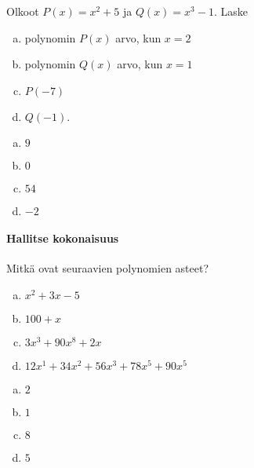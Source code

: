 \begin{tehtavasivu}
\begin{tehtava}
    Olkoot $P(x)=x^2+5$ ja $Q(x)=x^3-1$. Laske
    \begin{enumerate}[a)]
        \item polynomin $P(x)$ arvo, kun $x=2$
        \item polynomin $Q(x)$ arvo, kun $x=1$
        \item $P(-7)$
        \item $Q(-1)$.
    \end{enumerate}
    \begin{vastaus}
        \begin{enumerate}[a)]
            \item $9$ %
            \item $0$ %
            \item $54$ %
            \item $-2$ %
        \end{enumerate}
    \end{vastaus}
\end{tehtava}

\paragraph*{Hallitse kokonaisuus}

\begin{tehtava}
	Mitkä ovat seuraavien polynomien asteet?
	\begin{enumerate}[a)]
		\item $x^2 + 3x - 5$
		\item $100 + x$
		\item $3x^3 + 90x^8 + 2x$
		\item $12x^1 + 34x^2 + 56x^3 + 78x^5 + 90x^5$
	\end{enumerate}

	\begin{vastaus}
		\begin{enumerate}[a)]
			\item $2$
			\item $1$
			\item $8$
			\item $5$
		\end{enumerate}
	\end{vastaus}
\end{tehtava}


\end{tehtavasivu}
